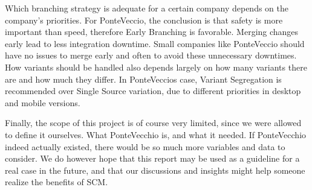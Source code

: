 \documentclass[10pt]{article}
\begin{document}
\noindent Which branching strategy is adequate for a certain company depends on the company's priorities. For PonteVeccio, the conclusion is that safety is more important than speed, therefore Early Branching is favorable. Merging changes early lead to less integration downtime. Small companies like PonteVeccio should have no issues to merge early and often to avoid these unnecessary downtimes. How variants should be handled also depends largely on how many variants there are and how much they differ. In PonteVeccios case, Variant Segregation is recommended over Single Source variation, due to different priorities in desktop and mobile versions.

\noindent Finally, the scope of this project is of course very limited, since we were allowed to define it ourselves. What PonteVecchio is, and what it needed. If PonteVecchio indeed actually existed, there would be so much more variables and data to consider. We do however hope that this report may be used as a guideline for a real case in the future, and that our discussions and insights might help someone realize the benefits of SCM. 
\newpage
{}
\end{document}
